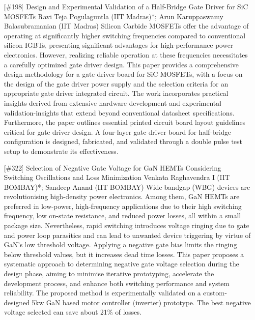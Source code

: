 {} \begin{abstract_online} {[\#198] Design and Experimental Validation of a Half-Bridge Gate Driver for SiC MOSFETs} {} {Ravi Teja Pogulaguntla (IIT Madras)*; Arun Karuppaswamy Balasubramanian (IIT Madras)} {} Silicon Carbide MOSFETs offer the advantage of operating at significantly higher switching frequencies compared to conventional silicon IGBTs, presenting significant advantages for high-performance power electronics. However, realizing reliable operation at these frequencies necessitates a carefully optimized gate driver design. This paper provides a comprehensive design methodology for a gate driver board for SiC MOSFETs, with a focus on the design of the gate driver power supply and the selection criteria for an appropriate gate driver integrated circuit. The work incorporates practical insights derived from extensive hardware development and experimental validation-insights that extend beyond conventional datasheet specifications. Furthermore, the paper outlines essential printed circuit board layout guidelines critical for gate driver design. A four-layer gate driver board for half-bridge configuration is designed, fabricated, and validated through a double pulse test setup to demonstrate its effectiveness. \end{abstract_online} 
{} \begin{abstract_online} {[\#322] Selection of Negative Gate Voltage for GaN HEMTs Considering  Switching Oscillations and Loss Minimization} {} {Venkata Raghavendra I (IIT BOMBAY)*; Sandeep Anand (IIT BOMBAY)} {} Wide-bandgap (WBG) devices are revolutionising high-density power electronics. Among them, GaN HEMTs are preferred in low-power, high-frequency applications due to their high switching frequency, low on-state resistance, and reduced power losses, all within a small package size.   Nevertheless, rapid switching introduces voltage ringing due to gate and power loop parasitics and can lead to unwanted device triggering by virtue of GaN's low threshold voltage. Applying a negative gate bias limits the ringing below threshold values, but it increases dead time losses. This paper proposes a systematic approach to determining negative gate voltage selection during the design phase, aiming to minimise iterative prototyping, accelerate the development process, and enhance both switching performance and system reliability. The proposed method is experimentally validated on a custom-designed 5kw GaN based motor controller (inverter) prototype.  The best negative voltage selected can save about 21\% of losses.  \end{abstract_online} 
